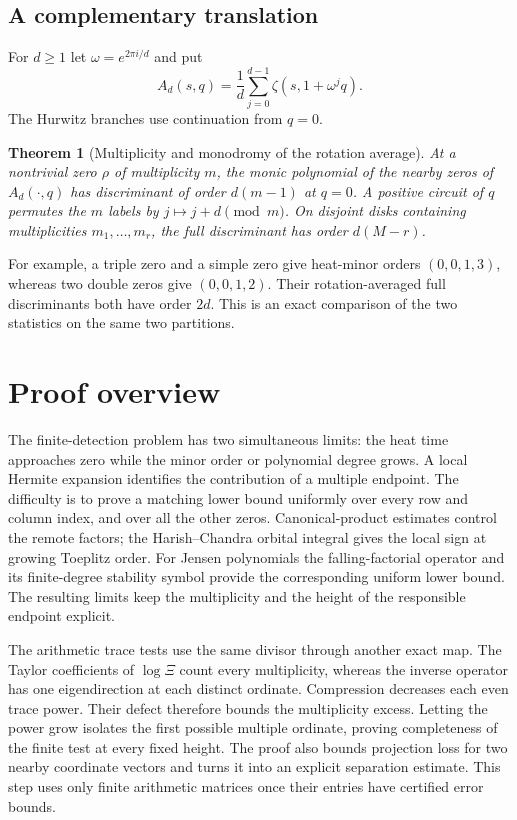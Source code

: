 \documentclass[11pt,a4paper]{article}
\newtheorem{theorem}{Theorem}[section]
\theoremstyle{definition}
\theoremstyle{remark}
\begin{document}
\subsection{A complementary translation}
For $d\ge1$ let $\omega=e^{2\pi i/d}$ and put
\[
 A_d(s,q)=\frac1d\sum_{j=0}^{d-1}\zeta(s,1+\omega^j q).
\]
The Hurwitz branches use continuation from $q=0$.
\begin{theorem}[Multiplicity and monodromy of the rotation average]\label{thm:phase-orders}
At a nontrivial zero $\rho$ of multiplicity $m$, the monic polynomial of the nearby zeros of $A_d(\cdot,q)$ has discriminant of order $d(m-1)$ at $q=0$. A positive circuit of $q$ permutes the $m$ labels by $j\mapsto j+d\pmod m$. On disjoint disks containing multiplicities $m_1,\ldots,m_r$, the full discriminant has order $d(M-r)$.
\end{theorem}
For example, a triple zero and a simple zero give heat-minor orders $(0,0,1,3)$, whereas two double zeros give $(0,0,1,2)$. Their rotation-averaged full discriminants both have order $2d$. This is an exact comparison of the two statistics on the same two partitions.



\section{Proof overview}
The finite-detection problem has two simultaneous limits: the heat time
approaches zero while the minor order or polynomial degree grows.
A local Hermite expansion identifies the contribution of a multiple
endpoint. The difficulty is to prove a matching lower bound uniformly
over every row and column index, and over all the other zeros.
Canonical-product estimates control the remote factors; the
Harish--Chandra orbital integral gives the local sign at growing
Toeplitz order. For Jensen polynomials the falling-factorial operator
and its finite-degree stability symbol provide the corresponding
uniform lower bound. The resulting limits keep the multiplicity and
the height of the responsible endpoint explicit.

The arithmetic trace tests use the same divisor through another exact
map. The Taylor coefficients of $\log\Xi$ count every multiplicity,
whereas the inverse operator has one eigendirection at each distinct
ordinate. Compression decreases each even trace power. Their defect
therefore bounds the multiplicity excess. Letting the power grow
isolates the first possible multiple ordinate, proving completeness of
the finite test at every fixed height. The proof also bounds projection
loss for two nearby coordinate vectors and turns it into an explicit
separation estimate. This step uses only finite arithmetic matrices
once their entries have certified error bounds.
\end{document}
